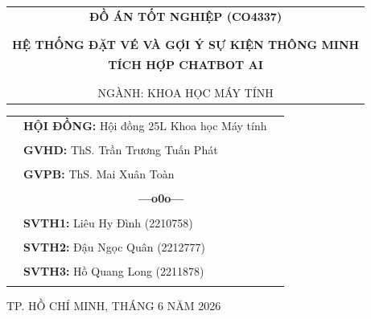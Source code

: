 \documentclass[a4paper]{article}
\theoremstyle{definition}
\begin{document}
\begin{titlepage}
\begin{center}
\begin{tabular}{c}
\multicolumn{1}{c}{\textbf{{\LARGE ĐỒ ÁN TỐT NGHIỆP (CO4337)}}}
\\
\\
\hline
\\
\textbf{\LARGE HỆ THỐNG ĐẶT VÉ VÀ GỢI Ý SỰ KIỆN THÔNG MINH}
\\
\textbf{\LARGE TÍCH HỢP CHATBOT AI}
\\
\\
\hline
\\
{\Large NGÀNH: KHOA HỌC MÁY TÍNH}
\end{tabular}
\end{center}
\vspace{0.1cm}
\begin{center}
\begin{table}[h]
\begin{tabular}{rll}
\hspace{3 cm} &  \textbf{\Large HỘI ĐỒNG:} {\Large Hội đồng 25L Khoa học Máy tính}
\\
\\
\hspace{3 cm} &   \textbf{\Large GVHD:} {\Large ThS. Trần Trương Tuấn Phát}
\\
\\
\hspace{3 cm}  &   \textbf{\Large GVPB:} {\Large ThS. Mai Xuân Toàn}
\\
\\
\hspace{3 cm} &     \textbf{$\;$ $\;$$\;$$\;$$\;$$\;$$\;$$\;$$\;$$\;$$\;$$\;$$\;$$\;$$\;$$\;$$\;$$\;$$\;$$\;$$\;$$\;$$\;$$\;$$\;$$\;$$\;$$\;$$\;$$\;$$\;$$\;$$\;$$\;$ \Large ---o0o---} 
\\
\\
\hspace{3 cm} &   \textbf{\Large SVTH1:} {\Large Liêu Hy Đình (2210758)}
\\
\\
\hspace{3 cm}&   \textbf{\Large SVTH2:}  {\Large Đậu Ngọc Quân (2212777)}
\\
\\
\hspace{3 cm} &   \textbf{\Large SVTH3:}  {\Large Hồ Quang Long (2211878)}
\\
\\
\end{tabular}
\end{table}
\end{center}
\vspace{0.1cm}
\begin{center}
{\Large TP. HỒ CHÍ MINH, THÁNG 6 NĂM 2026}
\end{center}
\end{titlepage}
\newpage
\pagestyle{empty}



\newpage
\tableofcontents
\newpage
\listoffigures
\newpage
\listoftables
\newpage
\pagestyle{fancy}
\setcounter{page}{1}
\end{document}

